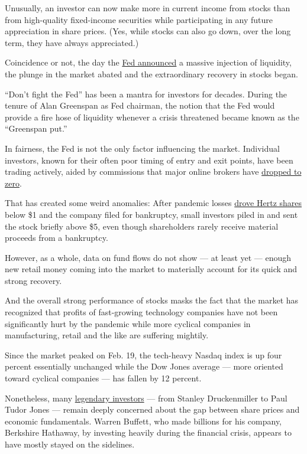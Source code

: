 Unusually, an investor can now make more in current income from stocks
than from high-quality fixed-income securities while participating in
any future appreciation in share prices. (Yes, while stocks can also go
down, over the long term, they have always appreciated.)

Coincidence or not, the day the
\href{https://www.nytimes.com/2020/03/23/business/economy/coronavirus-fed-bond-buying.html}{Fed
announced} a massive injection of liquidity, the plunge in the market
abated and the extraordinary recovery in stocks began.

``Don't fight the Fed'' has been a mantra for investors for decades.
During the tenure of Alan Greenspan as Fed chairman, the notion that the
Fed would provide a fire hose of liquidity whenever a crisis threatened
became known as the ``Greenspan put.''

In fairness, the Fed is not the only factor influencing the market.
Individual investors, known for their often poor timing of entry and
exit points, have been trading actively, aided by commissions that major
online brokers have
\href{https://www.nytimes.com/2019/10/01/your-money/charles-schwab-free-trades.html}{dropped
to zero}.

That has created some weird anomalies: After pandemic losses
\href{https://www.ft.com/content/b592847a-2061-4460-8aa5-3b22a2153210}{drove
Hertz shares} below \$1 and the company filed for bankruptcy, small
investors piled in and sent the stock briefly above \$5, even though
shareholders rarely receive material proceeds from a bankruptcy.

However, as a whole, data on fund flows do not show --- at least yet ---
enough new retail money coming into the market to materially account for
its quick and strong recovery.

And the overall strong performance of stocks masks the fact that the
market has recognized that profits of fast-growing technology companies
have not been significantly hurt by the pandemic while more cyclical
companies in manufacturing, retail and the like are suffering mightily.

Since the market peaked on Feb. 19, the tech-heavy Nasdaq index is up
four percent essentially unchanged while the Dow Jones average --- more
oriented toward cyclical companies --- has fallen by 12 percent.

Nonetheless, many
\href{https://www.bloomberg.com/news/articles/2020-05-13/wall-street-heavyweights-are-sounding-alarm-about-stock-prices?sref=qN0DZypA}{legendary
investors} --- from Stanley Druckenmiller to Paul Tudor Jones --- remain
deeply concerned about the gap between share prices and economic
fundamentals. Warren Buffett, who made billions for his company,
Berkshire Hathaway, by investing heavily during the financial crisis,
appears to have mostly stayed on the sidelines.

